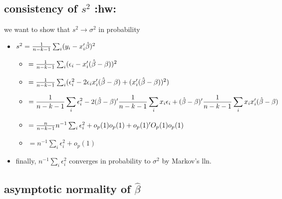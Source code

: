 \subsection{consistency of $s^2$ \textbf{:hw:}}
\label{sec-2-3}

     we want to show that $s^2 \to \sigma^2$ in probability
\begin{itemize}
\item $s^2 = {1 \over n - k - 1} \sum_i (y_i - x_i'\hat\beta)^2$
\begin{itemize}
\item $= {1 \over n - k - 1} \sum_i (\epsilon_i - x_i'(\hat\beta-\beta))^2$
\item $= {1 \over n - k - 1} \sum_i (\epsilon_i^2 - 2 \epsilon_i
         x_i'(\hat\beta-\beta) + (x_i'(\hat\beta-\beta))^2)$
\item \[= {1 \over n - k - 1} \sum_i \epsilon_i^2 - 2 (\hat\beta -
         \beta)' {1 \over n - k - 1} \sum_i  x_i \epsilon_i +
         (\hat\beta - \beta)' {1 \over n - k - 1} \sum_i x_i x_i'
         (\hat\beta - \beta)\]
\item $=  {n \over n - k - 1} n^{-1} \sum_i \epsilon_i^2 + o_p(1)
         o_p(1) + o_p(1)'O_p(1)o_p(1)$
\item $= n^{-1} \sum_i \epsilon_i^2 + o_p(1)$
\end{itemize}
\item finally, $n^{-1} \sum_i \epsilon_i^2$ converges in probability
       to $\sigma^2$ by Markov's lln.
\end{itemize}
\subsection{asymptotic normality of $\hat\beta$}
\label{sec-2-4}

